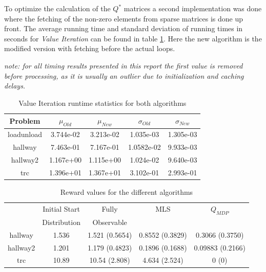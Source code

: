 \documentclass[10pt,a4paper]{article}
\begin{document}
To optimize the calculation of the $Q^{*}$ matrices a second implementation was done where the fetching of the non-zero elements from sparse matrices is done up front. 
The average running time and standard deviation of running times in seconds for \emph{Value Iteration} can be found in table \ref{table:vi}.
Here the new algorithm is the modified version with fetching before the actual loops.
\begin{framed}
\textit{note: for all timing results presented in this report the first value is removed before processing, as it is usually an outlier due to initialization and caching delays.}
\end{framed}
\newpage


\begin{table}
\centering
\begin{tabular}{ c || c | c || c | c}
Problem & $\mu_{Old}$ & $\mu_{New}$ & $\sigma_{Old}$ & $\sigma_{New}$ \\
\hline
loadunload & 3.744e-02 & 3.213e-02 & 1.035e-03 & 1.305e-03\\
hallway & 7.463e-01 & 7.167e-01 & 1.0582e-02 & 9.933e-03\\
hallway2 & 1.167e+00 & 1.115e+00 & 1.024e-02 & 9.640e-03 \\
trc & 1.396e+01 & 1.367e+01 & 3.102e-01 & 2.993e-01\\
\end{tabular}
\caption{Value Iteration runtime statistics for both algorithms}
\label{table:vi}
\end{table}

\begin{table}
\centering
\begin{tabular}{ c || c | c | c | c }
\hfill & Initial Start & Fully & MLS & $Q_{MDP}$\\
\hfill & Distribution &  Observable &  & \\
\hline
hallway & 1.536 & 1.521 (0.5654) & 0.8552 (0.3829) & 0.3066 (0.3750) \\
hallway2 & 1.201 & 1.179 (0.4823) & 0.1896 (0.1688) & 0.09883 (0.2166)\\
trc & 10.89 & 10.54 (2.808) & 4.634 (2.524) & 0 (0)
\\
\end{tabular}
\caption{Reward values for the different algorithms}
\label{table:rewards}
\end{table}
\end{document}
